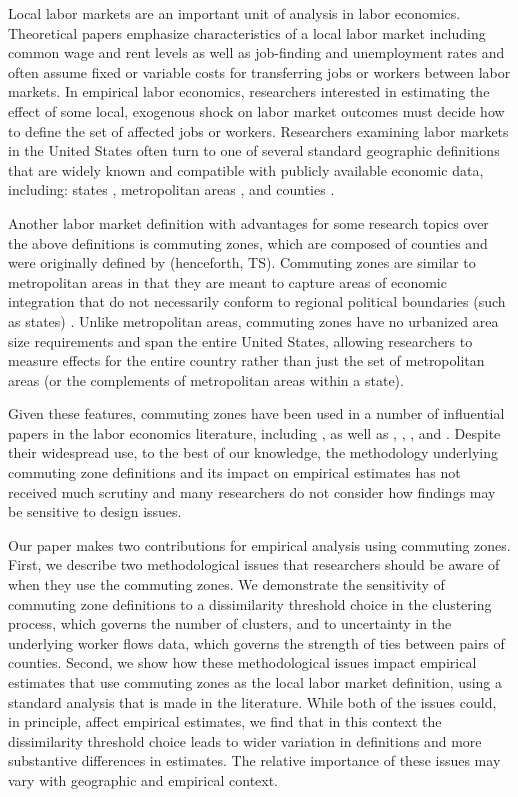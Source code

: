 Local labor markets are an important unit of analysis in labor economics. Theoretical papers emphasize characteristics of a local labor market including common wage and rent levels \citep{Roback1982,Moretti2011} as well as job-finding and unemployment rates \citep{HL2012,SS2014} and often assume fixed or variable costs for transferring jobs or workers between labor markets. In empirical labor economics, researchers interested in estimating the effect of some local, exogenous shock on labor market outcomes must decide how to define the set of affected jobs or workers. Researchers examining labor markets in the United States often turn to one of several standard geographic definitions that are widely known and compatible with publicly available economic data, including: states \citep{BK1992,Wozniak2010,KW2011}, metropolitan areas \citep{BH2000,Card2001,Notowidigdo2011,Diamond2016}, and counties \citep{MRR2015,FGS2015}.

Another labor market definition with advantages for some research topics over the above definitions is commuting zones, which are composed of counties and were originally defined by \citet{TS1996} (henceforth, TS). Commuting zones are similar to metropolitan areas in that they are meant to capture areas of economic integration that do not necessarily conform to regional political boundaries (such as states) \citep{FR2000,FR2010}. Unlike metropolitan areas, commuting zones have no urbanized area size requirements and span the entire United States, allowing researchers to measure effects for the entire country rather than just the set of metropolitan areas (or the complements of metropolitan areas within a state). 

Given these features, commuting zones have been used in a number of influential papers in the labor economics literature, including \citet{ADH2013}, as well as \citet{ChettyHendrenKlineSaez2014}, \citet{AM2015}, \citet{Restrepo2015}, and \citet{Yagan2016}. Despite their widespread use, to the best of our knowledge, the methodology underlying commuting zone definitions and its impact on empirical estimates has not received much scrutiny and many researchers do not consider how findings may be sensitive to design issues. 

Our paper makes two contributions for empirical analysis using commuting zones. First, we describe two methodological issues that researchers should be aware of when they use the commuting zones. We demonstrate the sensitivity of commuting zone definitions to a dissimilarity threshold choice in the clustering process, which governs the number of clusters, and to uncertainty in the underlying worker flows data, which governs the strength of ties between pairs of counties. Second, we show how these methodological issues impact empirical estimates that use commuting zones as the local labor market definition, using a standard analysis that is made in the literature. While both of the issues could, in principle, affect empirical estimates, we find that in this context the dissimilarity threshold choice leads to wider variation in definitions and more substantive differences in estimates. The relative importance of these issues may vary with geographic and empirical context.

